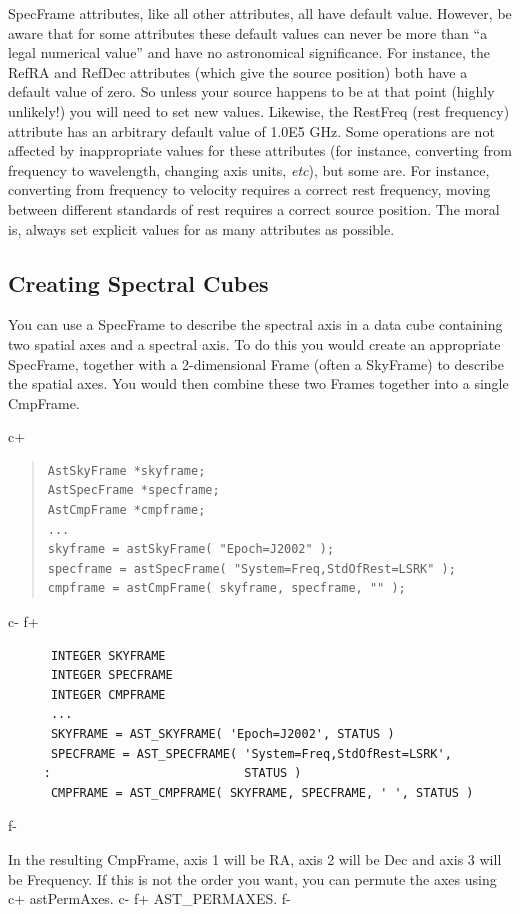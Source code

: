 \documentclass[twoside,11pt]{article}
\begin{document}
SpecFrame attributes, like all other attributes, all have default
value. However, be aware that for some attributes these default values
can never be more than ``a legal numerical value'' and have no
astronomical significance. For instance, the RefRA and RefDec attributes
(which give the source position) both have a default value of zero. So
unless your source happens to be at that point (highly unlikely!) you will
need to set new values. Likewise, the RestFreq (rest frequency) attribute
has an arbitrary default value of 1.0E5 GHz. Some operations are not
affected by inappropriate values for these attributes (for instance,
converting from frequency to wavelength, changing axis units, \emph{etc}),
but some are. For instance, converting from frequency to velocity
requires a correct rest frequency, moving between different standards of
rest requires a correct source position. The moral is, always set explicit
values for as many attributes as possible.

\subsection{\label{ss:creatingspectralcubes}Creating Spectral Cubes}
You can use a SpecFrame to describe the spectral axis in a data cube
containing two spatial axes and a spectral axis. To do this you would
create an appropriate SpecFrame, together with a 2-dimensional Frame
(often a SkyFrame) to describe the spatial axes. You would then combine
these two Frames together into a single CmpFrame.

c+
\begin{quote}
\small
\begin{verbatim}
AstSkyFrame *skyframe;
AstSpecFrame *specframe;
AstCmpFrame *cmpframe;
...
skyframe = astSkyFrame( "Epoch=J2002" );
specframe = astSpecFrame( "System=Freq,StdOfRest=LSRK" );
cmpframe = astCmpFrame( skyframe, specframe, "" );
\end{verbatim}
\normalsize
\end{quote}
c-
f+
\small
\begin{verbatim}
      INTEGER SKYFRAME
      INTEGER SPECFRAME
      INTEGER CMPFRAME
      ...
      SKYFRAME = AST_SKYFRAME( 'Epoch=J2002', STATUS )
      SPECFRAME = AST_SPECFRAME( 'System=Freq,StdOfRest=LSRK',
     :                           STATUS )
      CMPFRAME = AST_CMPFRAME( SKYFRAME, SPECFRAME, ' ', STATUS )
\end{verbatim}
\normalsize
f-

In the resulting CmpFrame, axis 1 will be RA, axis 2 will be Dec and axis
3 will be Frequency. If this is not the order you want, you can permute
the axes using
c+
astPermAxes.
c-
f+
AST\_PERMAXES.
f-
\end{document}
